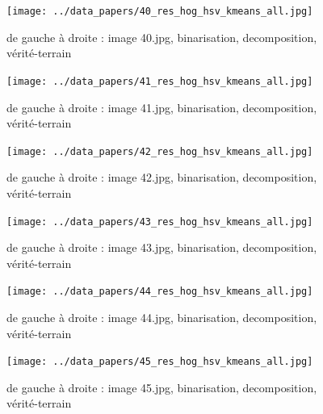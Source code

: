 \documentclass{book}
\begin{document}
\begin{figure}[H]
\begin{center}
\texttt{[image: ../data\_papers/40\_res\_hog\_hsv\_kmeans\_all.jpg]}
\end{center}
\caption{de gauche à droite : image 40.jpg, binarisation, decomposition, vérité-terrain}
\label{40}
\end{figure}
\clearpage


\begin{figure}[H]
\begin{center}
\texttt{[image: ../data\_papers/41\_res\_hog\_hsv\_kmeans\_all.jpg]}
\end{center}
\caption{de gauche à droite : image 41.jpg, binarisation, decomposition, vérité-terrain}
\label{41}
\end{figure}
\clearpage


\begin{figure}[H]
\begin{center}
\texttt{[image: ../data\_papers/42\_res\_hog\_hsv\_kmeans\_all.jpg]}
\end{center}
\caption{de gauche à droite : image 42.jpg, binarisation, decomposition, vérité-terrain}
\label{42}
\end{figure}
\clearpage


\begin{figure}[H]
\begin{center}
\texttt{[image: ../data\_papers/43\_res\_hog\_hsv\_kmeans\_all.jpg]}
\end{center}
\caption{de gauche à droite : image 43.jpg, binarisation, decomposition, vérité-terrain}
\label{43}
\end{figure}
\clearpage


\begin{figure}[H]
\begin{center}
\texttt{[image: ../data\_papers/44\_res\_hog\_hsv\_kmeans\_all.jpg]}
\end{center}
\caption{de gauche à droite : image 44.jpg, binarisation, decomposition, vérité-terrain}
\label{44}
\end{figure}
\clearpage


\begin{figure}[H]
\begin{center}
\texttt{[image: ../data\_papers/45\_res\_hog\_hsv\_kmeans\_all.jpg]}
\end{center}
\caption{de gauche à droite : image 45.jpg, binarisation, decomposition, vérité-terrain}
\label{45}
\end{figure}
\clearpage
\end{document}
